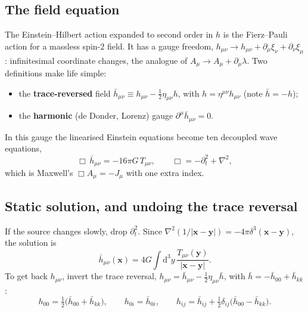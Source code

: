 \documentclass[11pt]{article}
\newcommand{\bx}{\mathbf{x}}\newcommand{\by}{\mathbf{y}}\newcommand{\bv}{\mathbf{v}}
\newcommand{\dd}{\mathrm{d}}
\begin{document}
\subsection{The field equation}
The Einstein--Hilbert action expanded to second order in $h$ is the Fierz--Pauli action for a massless spin-2 field. It has a gauge freedom, $h_{\mu\nu}\to h_{\mu\nu}+\partial_\mu\xi_\nu+\partial_\nu\xi_\mu$: infinitesimal coordinate changes, the analogue of $A_\mu\to A_\mu+\partial_\mu\lambda$. Two definitions make life simple:
\begin{itemize}[nosep]
\item the \textbf{trace-reversed} field $\bar h_{\mu\nu}\equiv h_{\mu\nu}-\tfrac12\eta_{\mu\nu}h$, with $h=\eta^{\mu\nu}h_{\mu\nu}$ (note $\bar h=-h$);
\item the \textbf{harmonic} (de Donder, Lorenz) gauge $\partial^\mu\bar h_{\mu\nu}=0$.
\end{itemize}
In this gauge the linearised Einstein equations become ten decoupled wave equations,
\begin{equation}
\Box\,\bar h_{\mu\nu}=-16\pi G\,T_{\mu\nu},\qquad \Box=-\partial_t^2+\nabla^2,
\label{eq:wave}
\end{equation}
which is Maxwell's $\Box A_\mu=-J_\mu$ with one extra index.

\subsection{Static solution, and undoing the trace reversal}
If the source changes slowly, drop $\partial_t^2$. Since $\nabla^2(1/|\bx-\by|)=-4\pi\delta^3(\bx-\by)$, the solution is
\begin{equation}
\bar h_{\mu\nu}(\bx)=4G\int\dd^3y\,\frac{T_{\mu\nu}(\by)}{|\bx-\by|}.
\label{eq:hbar}
\end{equation}
To get back $h_{\mu\nu}$, invert the trace reversal, $h_{\mu\nu}=\bar h_{\mu\nu}-\tfrac12\eta_{\mu\nu}\bar h$, with $\bar h=-\bar h_{00}+\bar h_{kk}$:
\begin{equation}
h_{00}=\tfrac12\big(\bar h_{00}+\bar h_{kk}\big),\qquad h_{0i}=\bar h_{0i},\qquad h_{ij}=\bar h_{ij}+\tfrac12\delta_{ij}\big(\bar h_{00}-\bar h_{kk}\big).
\label{eq:components}
\end{equation}
\end{document}
